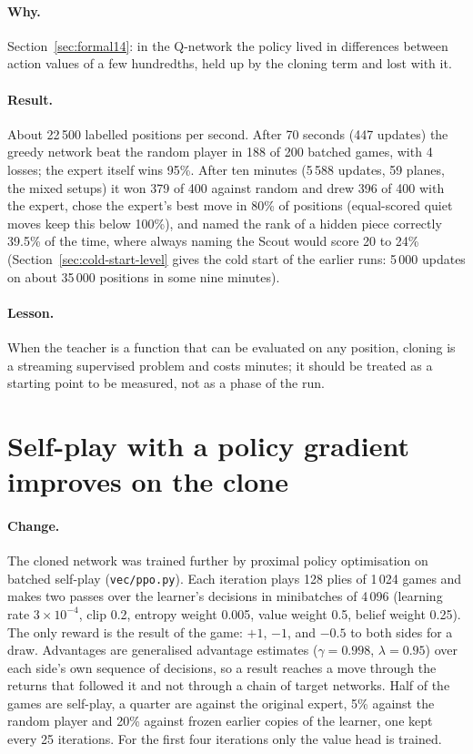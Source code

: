 \paragraph{Why.} Section~\ref{sec:formal14}: in the Q-network the policy lived in differences
between action values of a few hundredths, held up by the cloning term and lost with it.

\paragraph{Result.} About 22\,500 labelled positions per second. After 70 seconds (447 updates)
the greedy network beat the random player in 188 of 200 batched games, with 4 losses; the expert
itself wins 95\%. After ten minutes (5\,588 updates, 59 planes, the mixed setups) it won 379 of
400 against random and drew 396 of 400 with the expert, chose the expert's best move in 80\% of
positions (equal-scored quiet moves keep this below 100\%), and named the rank of a hidden piece
correctly 39.5\% of the time, where always naming the Scout would score 20 to 24\%
(Section~\ref{sec:cold-start-level} gives the cold start of the earlier runs: 5\,000 updates on
about 35\,000 positions in some nine minutes).

\paragraph{Lesson.} When the teacher is a function that can be evaluated on any position, cloning
is a streaming supervised problem and costs minutes; it should be treated as a starting point to
be measured, not as a phase of the run.

\section{Self-play with a policy gradient improves on the clone}
\label{sec:ppo}

\paragraph{Change.} The cloned network was trained further by proximal policy optimisation
\cite{PPO} on batched self-play (\texttt{vec/ppo.py}). Each iteration plays 128 plies of 1\,024
games and makes two passes over the learner's decisions in minibatches of 4\,096 (learning rate
$3 \times 10^{-4}$, clip 0.2, entropy weight 0.005, value weight 0.5, belief weight 0.25). The only
reward is the result of the game: $+1$, $-1$, and $-0.5$ to both sides for a draw. Advantages are
generalised advantage estimates \cite{GAE} ($\gamma = 0.998$, $\lambda = 0.95$) over each side's
own sequence of decisions, so a result reaches a move through the returns that followed it and not
through a chain of target networks. Half of the games are self-play, a quarter are against the
original expert, 5\% against the random player and 20\% against frozen earlier copies of the
learner, one kept every 25 iterations. For the first four iterations only the value head is
trained.

